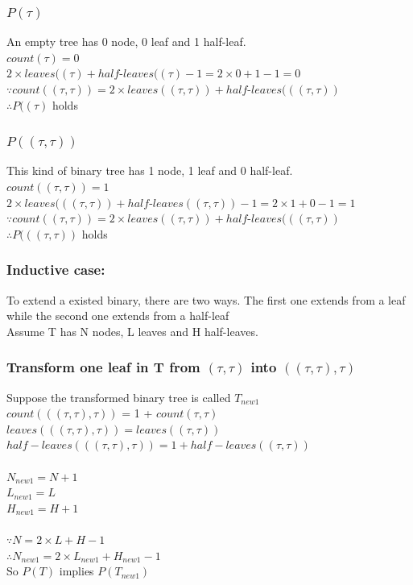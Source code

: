 \documentclass{article} %
\begin{document}
\subsubsection*{$P(\tau)$}
An empty tree has 0 node, 0 leaf and 1 half-leaf.\\
$count(\tau) = 0$\\
$2\times leaves((\tau)+half$-$leaves((\tau) - 1 = 2\times 0 + 1-1 = 0$\\
$\because count((\tau,\tau)) = 2\times leaves((\tau,\tau))+half$-$leaves(((\tau,\tau))$\\
$\therefore P((\tau)$ holds\\

\subsubsection*{$P((\tau,\tau))$}
This kind of binary tree has 1 node, 1 leaf and 0 half-leaf.\\
$count((\tau,\tau)) = 1$\\
$2\times leaves(((\tau,\tau))+half$-$leaves((\tau,\tau)) - 1 = 2\times 1 + 0-1 = 1$\\
$\because count((\tau,\tau)) = 2\times leaves((\tau,\tau))+half$-$leaves(((\tau,\tau))$\\
$\therefore P(((\tau,\tau))$ holds\\


\subsubsection*{Inductive case:}
To extend a existed binary, there are two ways. The first one extends from a leaf while the second one extends from a half-leaf\\
Assume T has N nodes, L leaves and H half-leaves. \\
\subsubsection*{Transform one leaf in T from $(\tau, \tau )$ into $((\tau,\tau),\tau)$}
Suppose the transformed binary tree is called $T_{new1}$\\
$count(((\tau,\tau),\tau))$ = 1 + $count(\tau, \tau)$\\
$leaves(((\tau,\tau),\tau)) = leaves((\tau,\tau))$\\
$half-leaves(((\tau,\tau),\tau)) = 1 + half-leaves((\tau,\tau))$\\
\\
$N_{new1} = N + 1$\\
$L_{new1} = L $\\
$H_{new1} = H + 1$\\
\\
$\because N = 2\times L + H - 1$\\
$\therefore N_{new1} = 2\times L_{new1} + H_{new1} - 1$\\
So $P(T)$ implies $P(T_{new1})$\\
\end{document}
